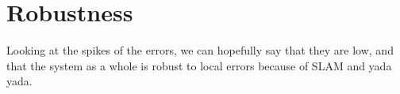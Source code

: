 \section{Robustness}

Looking at the spikes of the errors, we can hopefully say that they are low, and that the system as a whole is robust to local errors because of SLAM and yada yada.